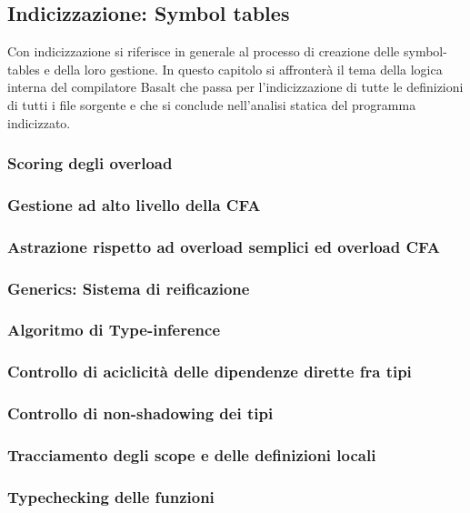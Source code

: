\subsection{Indicizzazione: Symbol tables}
Con indicizzazione si riferisce in generale al processo di creazione delle symbol-tables
e della loro gestione. In questo capitolo si affronterà il tema della logica interna 
del compilatore Basalt che passa per l'indicizzazione di tutte le definizioni di tutti i file 
sorgente e che si conclude nell'analisi statica del programma indicizzato. \\


\newpage


\newpage


\newpage


\newpage

\subsubsection{Scoring degli overload}
\subsubsection{Gestione ad alto livello della CFA}
\subsubsection{Astrazione rispetto ad overload semplici ed overload CFA}


\subsubsection{Generics: Sistema di reificazione}
\subsubsection{Algoritmo di Type-inference}

\subsubsection{Controllo di aciclicità delle dipendenze dirette fra tipi}
\subsubsection{Controllo di non-shadowing dei tipi}
\subsubsection{Tracciamento degli scope e delle definizioni locali}
\subsubsection{Typechecking delle funzioni}
